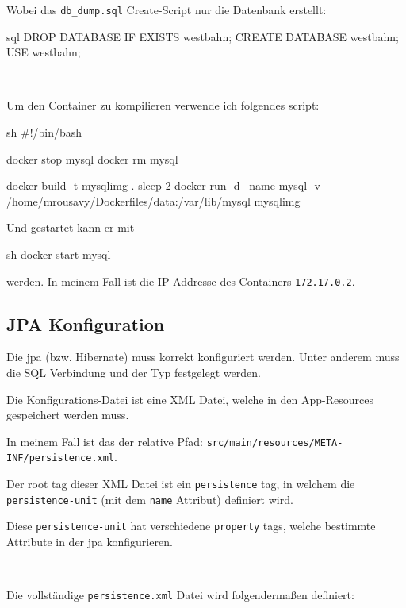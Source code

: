 Wobei das \texttt{db\_dump.sql} Create-Script nur die Datenbank erstellt:

\begin{code}{sql}
DROP DATABASE IF EXISTS westbahn;
CREATE DATABASE westbahn;
USE westbahn;
\end{code}

\

Um den Container zu kompilieren verwende ich folgendes script:

\begin{code}{sh}
#!/bin/bash

docker stop mysql
docker rm mysql

docker build -t mysqlimg .
sleep 2
docker run -d --name mysql -v /home/mrousavy/Dockerfiles/data:/var/lib/mysql mysqlimg
\end{code}

Und gestartet kann er mit

\begin{code}{sh}
docker start mysql
\end{code}

werden. In meinem Fall ist die IP Addresse des Containers \texttt{172.17.0.2}.

\clearpage
\subsection{JPA Konfiguration}

Die \gls{jpa} (bzw. Hibernate) muss korrekt konfiguriert werden. Unter anderem muss die SQL Verbindung und der Typ festgelegt werden.

Die Konfigurations-Datei ist eine XML Datei, welche in den App-Resources gespeichert werden muss.

In meinem Fall ist das der relative Pfad: \texttt{src/main/resources/META-INF/persistence.xml}.

Der root tag dieser XML Datei ist ein \texttt{persistence} tag, in welchem die \texttt{persistence-unit} (mit dem \texttt{name} Attribut) definiert wird.

Diese \texttt{persistence-unit} hat verschiedene \texttt{property} tags, welche bestimmte Attribute in der \gls{jpa} konfigurieren.

\

Die vollständige \texttt{persistence.xml} Datei wird folgendermaßen definiert:


